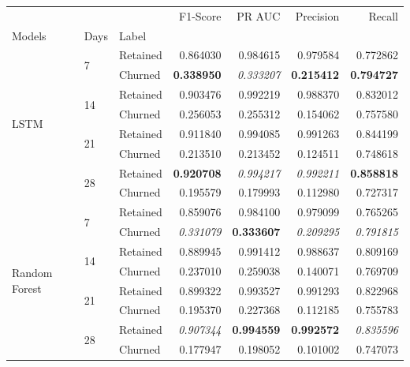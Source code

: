 \documentclass{kththesis}
\begin{document}
\begin{table}[h]
\centering
\begin{tabular}{lllrrrr}
\toprule
     &   &          &  F1-Score &    PR AUC &  Precision &    Recall \\
Models & Days & Label &           &           &            &           \\
\midrule
\multirow{8}{*}{LSTM} & \multirow{2}{*}{7} & Retained &  0.864030 &  0.984615 &   0.979584 &  0.772862 \\
     &   & Churned &  \textbf{0.338950} &  \textit{0.333207} &   \textbf{0.215412} &  \textbf{0.794727} \\
\cline{2-7}
     & \multirow{2}{*}{14} & Retained &  0.903476 &  0.992219 &   0.988370 &  0.832012 \\
     &   & Churned &  0.256053 &  0.255312 &   0.154062 &  0.757580 \\
\cline{2-7}
     & \multirow{2}{*}{21} & Retained &  0.911840 &  0.994085 &   0.991263 &  0.844199 \\
     &   & Churned &  0.213510 &  0.213452 &   0.124511 &  0.748618 \\
\cline{2-7}
     & \multirow{2}{*}{28} & Retained &  \textbf{0.920708} &  \textit{0.994217} &   \textit{0.992211} &  \textbf{0.858818} \\
     &   & Churned &  0.195579 &  0.179993 &   0.112980 &  0.727317 \\
\cline{1-7}
\cline{2-7}
\multirow{8}{*}{Random Forest} & \multirow{2}{*}{7} & Retained &  0.859076 &  0.984100 &   0.979099 &  0.765265 \\
     &   & Churned &  \textit{0.331079} &  \textbf{0.333607} &   \textit{0.209295} &  \textit{0.791815} \\
\cline{2-7}
     & \multirow{2}{*}{14} & Retained &  0.889945 &  0.991412 &   0.988637 &  0.809169 \\
     &   & Churned &  0.237010 &  0.259038 &   0.140071 &  0.769709 \\
\cline{2-7}
     & \multirow{2}{*}{21} & Retained &  0.899322 &  0.993527 &   0.991293 &  0.822968 \\
     &   & Churned &  0.195370 &  0.227368 &   0.112185 &  0.755783 \\
\cline{2-7}
     & \multirow{2}{*}{28} & Retained &  \textit{0.907344} &  \textbf{0.994559} &   \textbf{0.992572} &  \textit{0.835596} \\
     &   & Churned &  0.177947 &  0.198052 &   0.101002 &  0.747073 \\
\cline{1-7}
\cline{2-7}

\end{tabular}
\end{table}
\end{document}
